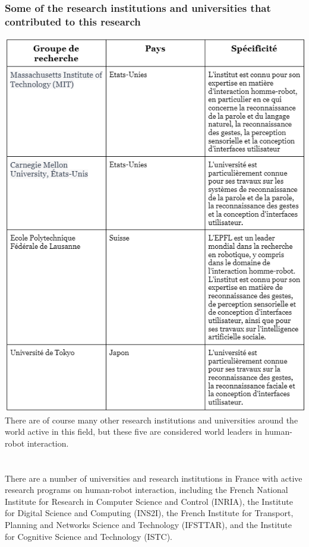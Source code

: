 \subsubsection{Some of the research institutions and universities that contributed to this research}
\includegraphics[width=14cm]{Figures/LR_tab1.png}\\
There are of course many other research institutions and universities around the world active in this field, but these five are considered world leaders in human-robot interaction.\\
\\
\\
There are a number of universities and research institutions in France with active research programs on human-robot interaction, including the French National Institute for Research in Computer Science and Control (INRIA), the Institute for Digital Science and Computing (INS2I), the French Institute for Transport, Planning and Networks Science and Technology (IFSTTAR), and the Institute for Cognitive Science and Technology (ISTC).\\

